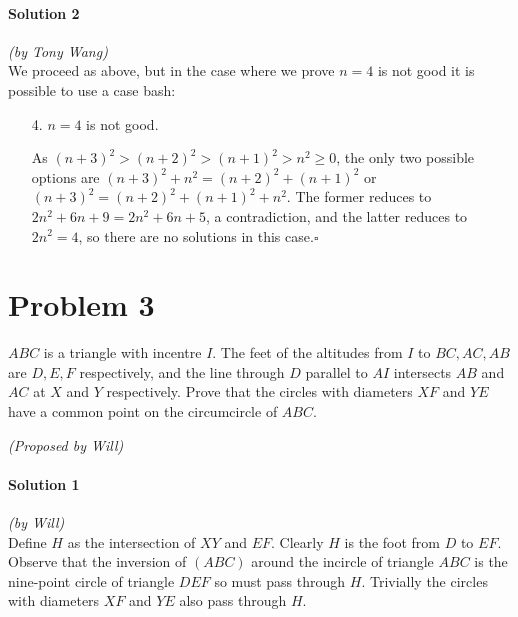 \documentclass[10pt]{article}
\begin{document}
		\noindent \makebox[\linewidth]{\rule{\textwidth}{0.4pt}}
	
	\paragraph{Solution 2} \textit{(by Tony Wang)}\\
	
	\noindent We proceed as above, but in the case where we prove \(n = 4\) is not good it is possible to use a case bash:
	
	\begin{enumerate}
	\item[4.] \(n = 4\) is not good.
	
	As \((n+3)^2 > (n+2)^2 > (n+1)^2 > n^2 \geq 0\), the only two possible options are \((n+3)^2 + n^2 = (n+2)^2 + (n+1)^2\) or \((n+3)^2 = (n+2)^2 + (n+1)^2 + n^2\). The former reduces to \(2n^2 + 6n + 9 = 2n^2 + 6n + 5\), a contradiction, and the latter reduces to \(2n^2 = 4\), so there are no solutions in this case.\hfill\ensuremath{\square}
	\end{enumerate}
	
	
	\newpage
	
	\section*{Problem 3}
	
	 $ABC$ is a triangle with incentre $I$. The feet of the altitudes from $I$ to $BC, AC, AB$ are $D, E, F$ respectively, and the line through $D$ parallel to $AI$ intersects \(AB\) and \(AC\) at \(X\) and \(Y\) respectively. Prove that the circles with diameters $XF$ and $YE$ have a common point on the circumcircle of $ABC.$\
	\begin{flushright}
	\textit{(Proposed by Will)}
	\end{flushright}
	
		\noindent \makebox[\linewidth]{\rule{\textwidth}{0.4pt}}	
	
	\paragraph{Solution 1} \textit{(by Will)}\\
	
	\noindent Define $H$ as the intersection of $XY$ and $EF$. Clearly $H$ is the foot from $D$ to $EF.$ Observe that the inversion of $(ABC)$ around the incircle of triangle $ABC$ is the nine-point circle of triangle $DEF$ so must pass through $H.$ Trivially the circles with diameters $XF$ and $YE$ also pass through $H.$
	
\end{document}
